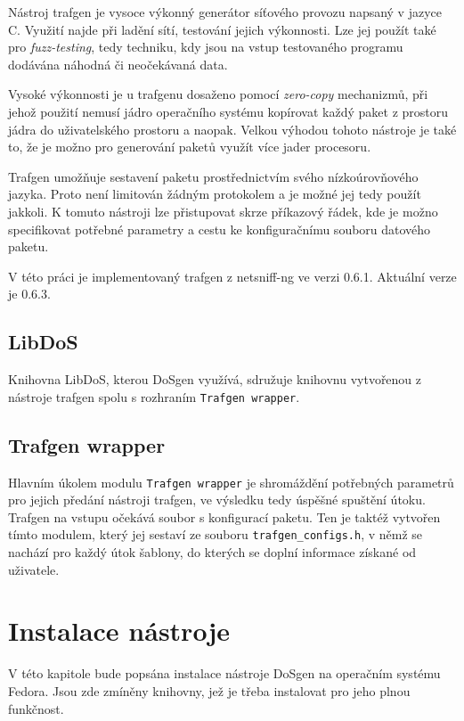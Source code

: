 Nástroj trafgen je vysoce výkonný generátor síťového provozu napsaný v jazyce C. Využití najde při ladění sítí, testování jejich výkonnosti. Lze jej použít také pro \textit{fuzz-testing}, tedy techniku, kdy jsou na vstup testovaného programu dodávána náhodná či neočekávaná data.

Vysoké výkonnosti je u trafgenu dosaženo pomocí \textit{zero-copy} mechanizmů, při jehož použití nemusí jádro operačního systému kopírovat každý paket z prostoru jádra do uživatelského prostoru a naopak. Velkou výhodou tohoto nástroje je také to, že je možno pro generování paketů využít více jader procesoru.

Trafgen umožňuje sestavení paketu prostřednictvím svého nízkoúrovňového jazyka. Proto není limitován žádným protokolem a je možné jej tedy použít jakkoli. K tomuto nástroji lze přistupovat skrze příkazový řádek, kde je možno specifikovat potřebné parametry a cestu ke konfiguračnímu souboru datového paketu.

V této práci je implementovaný trafgen z netsniff-ng ve verzi 0.6.1. Aktuální verze je 0.6.3.

\subsection{LibDoS}
Knihovna LibDoS, kterou DoSgen využívá, sdružuje knihovnu vytvořenou z nástroje trafgen spolu s rozhraním \texttt{Trafgen wrapper}.

\subsection{Trafgen wrapper}
Hlavním úkolem modulu \texttt{Trafgen wrapper} je shromáždění potřebných parametrů pro jejich předání nástroji trafgen, ve výsledku tedy úspěšné spuštění útoku. Trafgen na vstupu očekává soubor s konfigurací paketu. Ten je taktéž vytvořen tímto modulem, který jej sestaví ze souboru \texttt{trafgen\_configs.h}, v němž se nachází pro každý útok šablony, do kterých se doplní informace získané od uživatele.


\section{Instalace nástroje}
V této kapitole bude popsána instalace nástroje DoSgen na operačním systému Fedora. Jsou zde zmíněny knihovny, jež je třeba instalovat pro jeho plnou funkčnost. 

